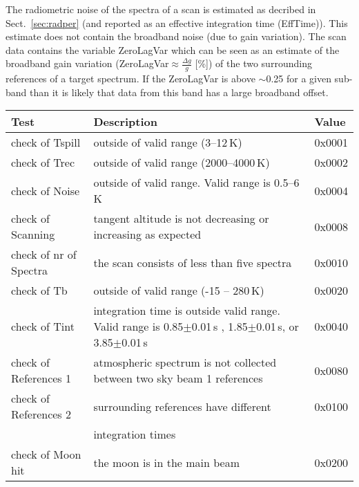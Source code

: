 The radiometric noise of the spectra of a scan is estimated as decribed  
in Sect.~\ref{sec:radper} (and reported as an effective integration time (EffTime)).
This estimate does not contain the broadband noise (due to gain variation). 
The scan data contains the variable ZeroLagVar which can be seen as an estimate
of the broadband gain variation (ZeroLagVar\(\approx \frac{\Delta g}{g}\) [\%]) 
of the two surrounding references of a target spectrum.
If the ZeroLagVar is above \(\sim\)0.25 for a given sub-band
than it is likely that data from this band has a large broadband offset.
  
 
\begin{table}
\caption{ Description of the \smr\ Quality variable. }
\label{table:quality}
\begin{longtable}{| p{} | p{} | p{} |}
  \hline
  \textbf{Test} & \textbf{Description} & \textbf{Value} \\
  \hline
  check of Tspill   & outside of valid range (3--12\,K) & 0x0001 \\
  \hline
  check of Trec     & outside of valid range (2000--4000\,K) & 0x0002  \\
  \hline
  check of Noise    & outside of valid range. Valid range is 0.5--6\,K & 0x0004  \\
  \hline
  check of Scanning & tangent altitude is not decreasing or increasing as expected & 0x0008 \\
  \hline
  check of nr of Spectra &  the scan consists of less than five spectra & 0x0010\\
  \hline
  check of Tb       & outside of valid range (-15 -- 280\,K) & 0x0020\\ 
  \hline
  check of Tint     & integration time is outside valid range. Valid range is
                      0.85\(\pm\)0.01\,s , 1.85\(\pm\)0.01\,s, or 3.85\(\pm\)0.01\,s & 0x0040\\
  \hline
  check of References 1 & atmospheric spectrum is not collected between two sky beam 1 references     & 0x0080\\
  \hline
  check of References 2 & surrounding references have different & 0x0100\\
                        & integration times                     & \\ 
  \hline check of Moon hit   & the moon is in the main beam          & 0x0200 \\

\hline
\end{longtable}
\end{table}
\addtocounter{table}{-1}


